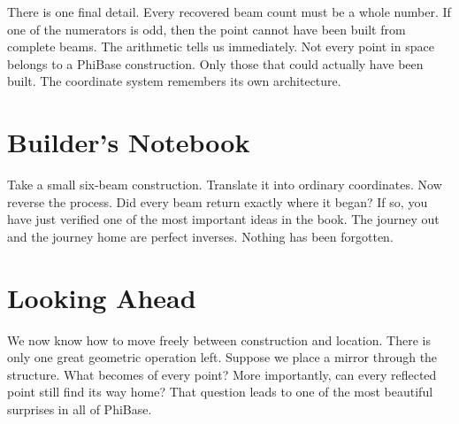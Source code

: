 There is one final detail. Every recovered beam count must be a whole number. If one of the numerators is odd, then the point cannot have been built from complete beams. The arithmetic tells us immediately. Not every point in space belongs to a PhiBase construction. Only those that could actually have been built. The coordinate system remembers its own architecture.

\section*{Builder's Notebook}

Take a small six-beam construction. Translate it into ordinary coordinates. Now reverse the process. Did every beam return exactly where it began? If so, you have just verified one of the most important ideas in the book. The journey out and the journey home are perfect inverses. Nothing has been forgotten.

\section*{Looking Ahead}

We now know how to move freely between construction and location. There is only one great geometric operation left. Suppose we place a mirror through the structure. What becomes of every point? More importantly, can every reflected point still find its way home? That question leads to one of the most beautiful surprises in all of PhiBase.
